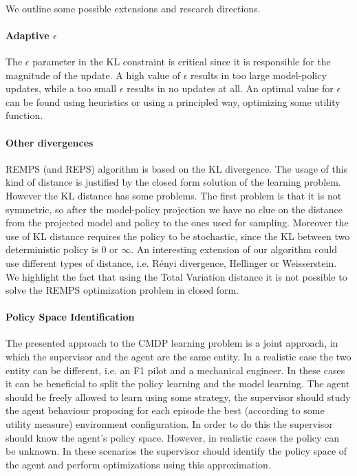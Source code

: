 \paragraph{}
We outline some possible extensions and research directions.
\paragraph{Adaptive $\epsilon$}
The $\epsilon$ parameter in the KL constraint is critical since it is responsible for the magnitude of the update. A high value of $\epsilon$ results in too large model-policy updates, while a too small $\epsilon$ results in no updates at all. An optimal value for $\epsilon$ can be found using heuristics or using a principled way, optimizing some utility function.
\paragraph{Other divergences}
REMPS (and REPS) algorithm is based on the KL divergence. The usage of this kind of distance is justified by the closed form solution of the learning problem. However the KL distance has some problems. The first problem is that it is not symmetric, so after the model-policy projection we have no clue on the distance from the projected model and policy to the ones used for sampling. Moreover the use of KL distance requires the policy to be stochastic, since the KL between two deterministic policy is $0$ or $\infty$. 
An interesting extension of our algorithm could use different types of distance, i.e. Rényi divergence, Hellinger or Weisserstein. We highlight the fact that using the Total Variation distance it is not possible to solve the REMPS optimization problem in closed form.
\paragraph{Policy Space Identification}
The presented approach to the CMDP learning problem is a joint approach, in which the supervisor and the agent are the same entity. In a realistic case the two entity can be different, i.e. an F1 pilot and a mechanical engineer. In these cases it can be beneficial to split the policy learning and the model learning. The agent should be freely allowed to learn using some strategy, the supervisor should study the agent behaviour proposing for each episode the best (according to some utility measure) environment configuration. In order to do this the supervisor should know the agent's policy space. However, in realistic cases the policy can be unknown. In these scenarios the supervisor should identify the policy space of the agent and perform optimizations using this approximation.
